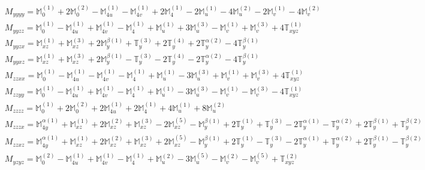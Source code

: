 \documentclass[fleqn,8pt,landscape]{jsarticle}
\begin{document}
\begin{align*}
& M_{yyyy} = \mathbb{M}_{0}^{(1)} + 2 \mathbb{M}_{0}^{(2)} - \mathbb{M}_{4u}^{(1)} - \mathbb{M}_{4v}^{(1)} + 2 \mathbb{M}_{4}^{(1)} - 2 \mathbb{M}_{u}^{(1)} - 4 \mathbb{M}_{u}^{(2)} - 2 \mathbb{M}_{v}^{(1)} - 4 \mathbb{M}_{v}^{(2)} \\
& M_{yyzz} = \mathbb{M}_{0}^{(1)} - \mathbb{M}_{4u}^{(1)} + \mathbb{M}_{4v}^{(1)} - \mathbb{M}_{4}^{(1)} + \mathbb{M}_{u}^{(1)} + 3 \mathbb{M}_{u}^{(3)} - \mathbb{M}_{v}^{(1)} + \mathbb{M}_{v}^{(3)} + 4 \mathbb{T}_{xyz}^{(1)} \\
& M_{yyzx} = \mathbb{M}_{xz}^{(1)} + \mathbb{M}_{xz}^{(3)} + 2 \mathbb{M}_{y}^{\beta(1)} + \mathbb{T}_{y}^{(3)} + 2 \mathbb{T}_{y}^{(4)} + 2 \mathbb{T}_{y}^{\alpha(2)} - 4 \mathbb{T}_{y}^{\beta(1)} \\
& M_{yyxz} = \mathbb{M}_{xz}^{(1)} + \mathbb{M}_{xz}^{(3)} + 2 \mathbb{M}_{y}^{\beta(1)} - \mathbb{T}_{y}^{(3)} - 2 \mathbb{T}_{y}^{(4)} - 2 \mathbb{T}_{y}^{\alpha(2)} - 4 \mathbb{T}_{y}^{\beta(1)} \\
& M_{zzxx} = \mathbb{M}_{0}^{(1)} - \mathbb{M}_{4u}^{(1)} - \mathbb{M}_{4v}^{(1)} - \mathbb{M}_{4}^{(1)} + \mathbb{M}_{u}^{(1)} - 3 \mathbb{M}_{u}^{(3)} + \mathbb{M}_{v}^{(1)} + \mathbb{M}_{v}^{(3)} + 4 \mathbb{T}_{xyz}^{(1)} \\
& M_{zzyy} = \mathbb{M}_{0}^{(1)} - \mathbb{M}_{4u}^{(1)} + \mathbb{M}_{4v}^{(1)} - \mathbb{M}_{4}^{(1)} + \mathbb{M}_{u}^{(1)} - 3 \mathbb{M}_{u}^{(3)} - \mathbb{M}_{v}^{(1)} - \mathbb{M}_{v}^{(3)} - 4 \mathbb{T}_{xyz}^{(1)} \\
& M_{zzzz} = \mathbb{M}_{0}^{(1)} + 2 \mathbb{M}_{0}^{(2)} + 2 \mathbb{M}_{4u}^{(1)} + 2 \mathbb{M}_{4}^{(1)} + 4 \mathbb{M}_{u}^{(1)} + 8 \mathbb{M}_{u}^{(2)} \\
& M_{zzzx} = \mathbb{M}_{4y}^{\alpha(1)} + \mathbb{M}_{xz}^{(1)} + 2 \mathbb{M}_{xz}^{(2)} + \mathbb{M}_{xz}^{(3)} - 2 \mathbb{M}_{xz}^{(5)} - \mathbb{M}_{y}^{\beta(1)} + 2 \mathbb{T}_{y}^{(1)} + \mathbb{T}_{y}^{(3)} - 2 \mathbb{T}_{y}^{\alpha(1)} - \mathbb{T}_{y}^{\alpha(2)} + 2 \mathbb{T}_{y}^{\beta(1)} + \mathbb{T}_{y}^{\beta(2)} \\
& M_{zzxz} = \mathbb{M}_{4y}^{\alpha(1)} + \mathbb{M}_{xz}^{(1)} + 2 \mathbb{M}_{xz}^{(2)} + \mathbb{M}_{xz}^{(3)} + 2 \mathbb{M}_{xz}^{(5)} - \mathbb{M}_{y}^{\beta(1)} + 2 \mathbb{T}_{y}^{(1)} - \mathbb{T}_{y}^{(3)} - 2 \mathbb{T}_{y}^{\alpha(1)} + \mathbb{T}_{y}^{\alpha(2)} + 2 \mathbb{T}_{y}^{\beta(1)} - \mathbb{T}_{y}^{\beta(2)} \\
& M_{yzyz} = \mathbb{M}_{0}^{(2)} - \mathbb{M}_{4u}^{(1)} + \mathbb{M}_{4v}^{(1)} - \mathbb{M}_{4}^{(1)} + \mathbb{M}_{u}^{(2)} - 3 \mathbb{M}_{u}^{(5)} - \mathbb{M}_{v}^{(2)} - \mathbb{M}_{v}^{(5)} + \mathbb{T}_{xyz}^{(2)} \\

\end{align*}
\end{document}
